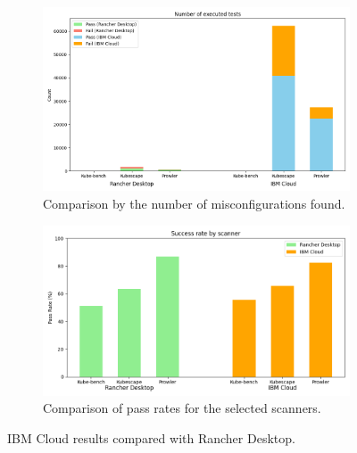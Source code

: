 \begin{figure}[!h]
        \centering
        \begin{subfigure}{.45\textwidth}
        \centering
        \includegraphics[width=\textwidth]{images/ibm-cloud-count-comparison.png}
        \caption{Comparison by the number of misconfigurations found.}
        \label{img:vulnerabilites-by-severity}
        \end{subfigure}
        \begin{subfigure}{.45\textwidth}
        \centering
        \includegraphics[width=\textwidth]{images/ibm-cloud-success-rate-comparison.png}
        \caption{Comparison of pass rates for the selected scanners.}
        \label{img:vulnerabilites-by-application-type}
        \end{subfigure}
        \caption{IBM Cloud results compared with Rancher Desktop.}
        \label{fig:ibm-cloud-results}
\end{figure}

